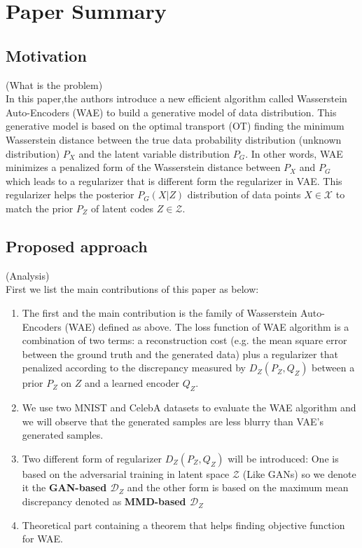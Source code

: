 \documentclass[12pt,english]{amsart}
\begin{document}
\section{Paper Summary}
\subsection{Motivation}
(What is the problem)\\
In this paper,the authors introduce a new efficient algorithm called Wasserstein
Auto-Encoders (WAE) to build a generative model of data distribution. This
generative model is based on the optimal transport (OT) finding the minimum
Wasserstein distance between the true data probability distribution (unknown
distribution) $P_X$ and the latent variable distribution $P_G$. In other words,
WAE minimizes a penalized form of the Wasserstein distance between $P_X$ and
$P_G$ which leads to a regularizer that is different form the regularizer in
VAE. This regularizer helps the posterior $P_G(X|Z)$ distribution of data points
$X\in \mathcal{X}$ to match the prior $P_Z$ of latent codes $Z \in \mathcal{Z}$.

\subsection{Proposed approach}

(Analysis)\\

First we list the main contributions of this paper as below:

\begin{enumerate}
  \item The first and the main contribution is the family of Wasserstein
        Auto-Encoders (WAE) defined as above. The loss function of WAE algorithm
        is a combination of two terms: a reconstruction cost (e.g. the mean square error between the ground truth and the generated data) plus a regularizer that penalized according to the discrepancy measured by $D_{Z}(P_Z, Q_Z)$ between a prior $P_Z$ on $Z$ and a learned encoder $Q_Z$. 

  \item We use two MNIST and CelebA datasets to evaluate the WAE algorithm and we
        will observe that the generated samples are less blurry than VAE's generated
        samples.

  \item Two different form of regularizer $D_Z(P_Z, Q_Z)$ will be introduced: One
        is based on the adversarial training in latent space $\mathcal{Z}$ (Like
        GANs) so we denote it the \textbf{ GAN-based $\mathcal{D}_Z$} and the
        other form is based on the maximum mean discrepancy denoted as
        \textbf{MMD-based $\mathcal{D}_Z $}

  \item Theoretical part containing a theorem that helps finding objective
        function for WAE.

\end{enumerate}
\end{document}
